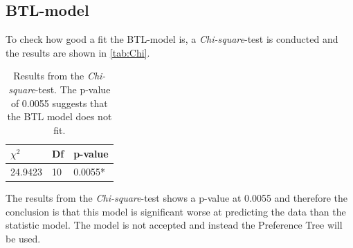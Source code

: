 \subsection*{BTL-model}
%
To check how good a fit the BTL-model is, a \textit{Chi-square}-test is conducted and the results are shown in \autoref{tab:Chi}. 
%
\begin{table}[H]
\centering
\begin{tabular}{@{}lll@{}}
\toprule
$\chi^{2}$   & Df  & p-value \\ \midrule
24.9423      & 10  & 0.0055* \\ \bottomrule
\end{tabular}
\caption{Results from the \textit{Chi-square}-test. The p-value of 0.0055 suggests that the BTL model does not fit.}
\label{tab:Chi}
\end{table} 
\noindent 
%
The results from the \textit{Chi-square}-test shows a p-value at 0.0055 and therefore the conclusion is that this model is significant worse at predicting the data than the statistic model. The model is not accepted and instead the Preference Tree will be used. 

